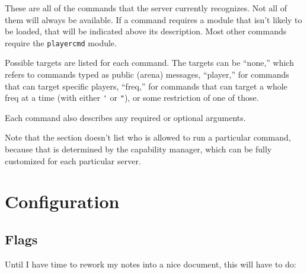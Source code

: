 \documentclass{article}
\begin{document}
These are all of the commands that the server currently recognizes. Not
all of them will always be available. If a command requires a module
that isn't likely to be loaded, that will be indicated above its
description. Most other commands require the \texttt{playercmd} module.

Possible targets are listed for each command. The targets can be
``none,'' which refers to commands typed as public (arena) messages,
``player,'' for commands that can target specific players, ``freq,'' for
commands that can target a whole freq at a time (with either \verb/'/ or
\verb/"/), or some restriction of one of those.

Each command also describes any required or optional arguments.

Note that the section doesn't list who is allowed to run a particular
command, because that is determined by the capability manager, which can
be fully customized for each particular server.




\section{Configuration}


\subsection{Flags}

Until I have time to rework my notes into a nice document, this will
have to do:
\end{document}
